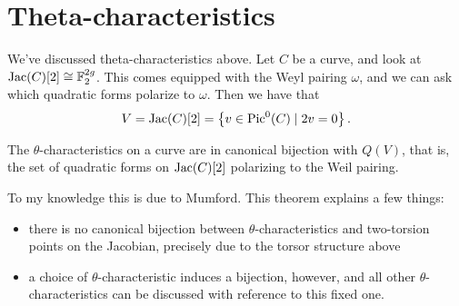 \documentclass[11pt]{amsart}
\begin{document}


\section{Theta-characteristics}

We've discussed theta-characteristics above. Let $C$ be a curve, and look at $\mathrm{Jac}(C)[2] \cong \mathbb{F}_2^{2g}$. This comes equipped with the Weyl pairing $\omega$, and we can ask which quadratic forms polarize to $\omega$. Then we have that
\begin{align*}
    V = \mathrm{Jac}(C)[2] = \left\{ v\in \mathrm{Pic}^0(C) \mid 2v = 0 \right\}.
\end{align*}
%
\begin{theorem} The $\theta$-characteristics on a curve are in canonical bijection with $Q(V)$, that is, the set of quadratic forms on $\mathrm{Jac}(C)[2]$ polarizing to the Weil pairing.
\end{theorem}
To my knowledge this is due to Mumford. This theorem explains a few things:
\begin{itemize}
    \item there is no canonical bijection between $\theta$-characteristics and two-torsion points on the Jacobian, precisely due to the torsor structure above
    \item a choice of $\theta$-characteristic induces a bijection, however, and all other $\theta$-characteristics can be discussed with reference to this fixed one.
\end{itemize}
\end{document}
